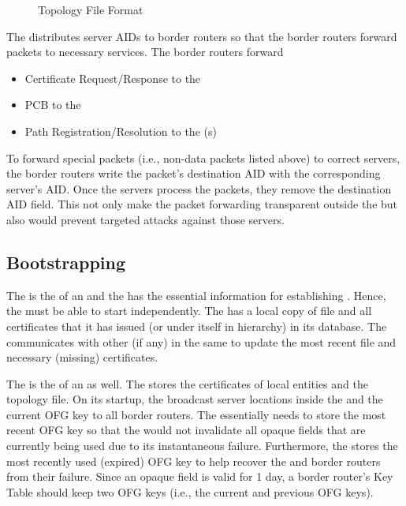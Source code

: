 \begin{figure}[h]
\centering
\begin{center}
\end{center}
\caption{Topology File Format}\label{fig:topology-file}
\end{figure}


The \CS distributes server AIDs to border routers so that the border routers forward packets to necessary services. The border routers forward
\begin{itemize}
\item Certificate Request/Response to the \CS
\item PCB to the \BS
\item Path Registration/Resolution to the \PS(s)
\end{itemize}

To forward special packets (i.e., non-data packets listed above) to correct servers, the border routers write the packet's destination AID with the corresponding server's AID. Once the servers process the packets, they remove the destination AID field. This not only make the packet forwarding transparent outside the \AD but also would prevent targeted attacks against those servers.

\subsection{Bootstrapping}
\noindent {\bf \ISDC \CS: }
The \ISDC is the \RT of an \ISD and the \ISDC \CS has the essential information for establishing \RT. Hence, the \ISDC \CS must be able to start independently. The \ISDC \CS has a local copy of \RT file and all \AD certificates that it has issued (or under itself in \ISDC hierarchy) in its database. The \ISDC \CS communicates with other \ISDC \CSs (if any) in the same \ISD to update the most recent \RT file and necessary (missing) certificates.

\noindent {\bf \AD \CS: } The \CS is the \RT of an \AD as well. The \CS stores the certificates of local entities and the topology file. On its startup, the \CS broadcast server locations inside the \AD and the current OFG key to all border routers. The \CS essentially needs to store the most recent OFG key so that the \CS would not invalidate all opaque fields that are currently being used due to its instantaneous failure. Furthermore, the \CS stores the most recently used (expired) OFG key to help recover the \BS and border routers from their failure. Since an opaque field is valid for 1 day, a border router's Key Table should keep two OFG keys (i.e., the current and previous OFG keys).

